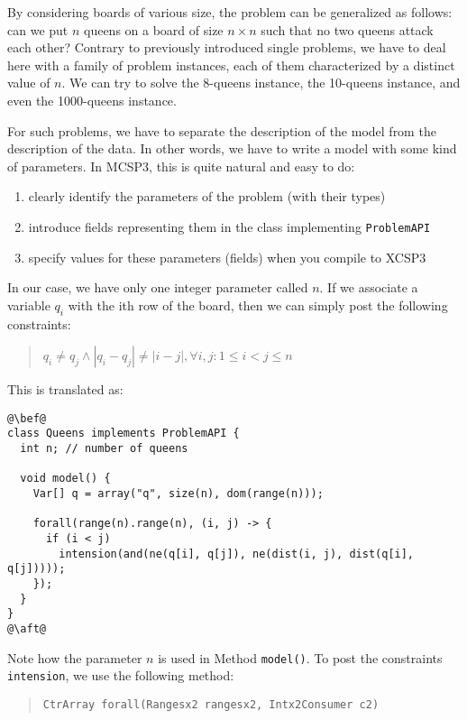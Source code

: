 \documentclass[10pt]{article}
\def\xt{{\rm XCSP3}\xspace}
\newcommand{\gb}[1]{{\tt #1}} %
\newcommand{\nn}[1]{{\tt #1}} %
\def\mt{{\rm MCSP3}\xspace}
\def\xt{{\rm XCSP3}\xspace}
\begin{document}
By considering boards of various size, the problem can be generalized as follows: can we put $n$ queens on a board of size $n \times n$ such that no two queens attack each other?
Contrary to previously introduced single problems, we have to deal here with a family of problem instances, each of them characterized by a distinct value of $n$.
We can try to solve the 8-queens instance, the 10-queens instance, and even the 1000-queens instance.

For such problems, we have to separate the description of the model from the description of the data.
In other words, we have to write a model with some kind of parameters.
In \mt, this is quite natural and easy to do:
\begin{enumerate}
\item clearly identify the parameters of the problem (with their types)
\item introduce fields representing them in the class implementing \nn{ProblemAPI}
\item specify values for these parameters (fields) when you compile to \xt   
\end{enumerate}

In our case, we have only one integer parameter called $n$.
If we associate a variable $q_i$ with the ith row of the board, then we can simply post the following constraints:
\begin{quote}
  $q_i \neq q_j \land |q_i - q_j| \neq |i - j|, \forall i, j : 1 \leq i < j \leq n$
\end{quote}
This is translated as:

\begin{lstlisting}
@\bef@
class Queens implements ProblemAPI {
  int n; // number of queens

  void model() {
    Var[] q = array("q", size(n), dom(range(n)));
    
    forall(range(n).range(n), (i, j) -> {
      if (i < j)
        intension(and(ne(q[i], q[j]), ne(dist(i, j), dist(q[i], q[j]))));
    });
  }
}
@\aft@
\end{lstlisting}

Note how the parameter $n$ is used in Method \nn{model()}.
To post the constraints \gb{intension}, we use the following method:

\begin{quote}
\begin{verbatim}
CtrArray forall(Rangesx2 rangesx2, Intx2Consumer c2) 
\end{verbatim}
\end{quote}
\end{document}
